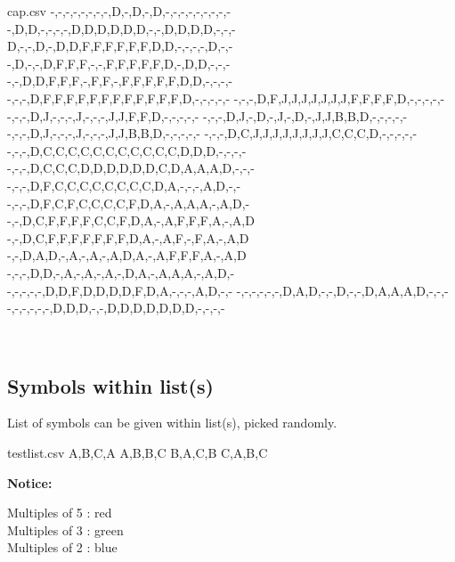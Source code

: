 \documentclass{article}
\begin{document}
\begin{PresentationCode}{}

\begin{filecontents*}[overwrite]{cap.csv}
	-,-,-,-,-,-,-,-,D,-,D,-,D,-,-,-,-,-,-,-,-,-
	-,D,D,-,-,-,-,D,D,D,D,D,D,-,-,D,D,D,D,-,-,-
	D,-,-,D,-,D,D,F,F,F,F,F,F,D,D,-,-,-,-,D,-,-
	-,D,-,-,D,F,F,F,-,-,F,F,F,F,F,D,-,D,D,-,-,-
	-,-,D,D,F,F,F,-,F,F,-,F,F,F,F,F,D,D,-,-,-,-
	-,-,-,D,F,F,F,F,F,F,F,F,F,F,F,F,D,-,-,-,-,-
	-,-,-,D,F,J,J,J,J,J,J,J,F,F,F,F,D,-,-,-,-,-
	-,-,-,D,J,-,-,-,J,-,-,-,J,J,F,F,D,-,-,-,-,-
	-,-,-,D,J,-,D,-,J,-,D,-,J,J,B,B,D,-,-,-,-,-
	-,-,-,D,J,-,-,-,J,-,-,-,J,J,B,B,D,-,-,-,-,-
	-,-,-,D,C,J,J,J,J,J,J,J,J,C,C,C,D,-,-,-,-,-
	-,-,-,D,C,C,C,C,C,C,C,C,C,C,C,D,D,D,-,-,-,-
	-,-,-,D,C,C,C,D,D,D,D,D,D,C,D,A,A,A,D,-,-,-
	-,-,-,D,F,C,C,C,C,C,C,C,C,D,A,-,-,-,A,D,-,-
	-,-,-,D,F,C,F,C,C,C,C,F,D,A,-,A,A,A,-,A,D,-
	-,-,D,C,F,F,F,F,C,C,F,D,A,-,A,F,F,F,A,-,A,D
	-,-,D,C,F,F,F,F,F,F,F,D,A,-,A,F,-,F,A,-,A,D
	-,-,D,A,D,-,A,-,A,-,A,D,A,-,A,F,F,F,A,-,A,D
	-,-,-,D,D,-,A,-,A,-,A,-,D,A,-,A,A,A,-,A,D,-
	-,-,-,-,-,D,D,F,D,D,D,D,F,D,A,-,-,-,A,D,-,-
	-,-,-,-,-,-,D,A,D,-,-,D,-,-,D,A,A,A,D,-,-,-
	-,-,-,-,-,-,D,D,D,-,-,D,D,D,D,D,D,D,-,-,-,-
\end{filecontents*}

~~
\end{PresentationCode}

\pagebreak

\subsection{Symbols within list(s)}

List of symbols can be given within list(s), picked randomly.

\begin{PresentationCode}{}
\begin{filecontents*}[overwrite]{testlist.csv}
A,B,C,A
A,B,B,C
B,A,C,B
C,A,B,C
\end{filecontents*}

\textbf{Notice:}

Multiples of 5 : red\\
Multiples of 3 : green\\
Multiples of 2 : blue

\hspace{5mm}
\hspace{5mm}
\end{PresentationCode}
\end{document}
